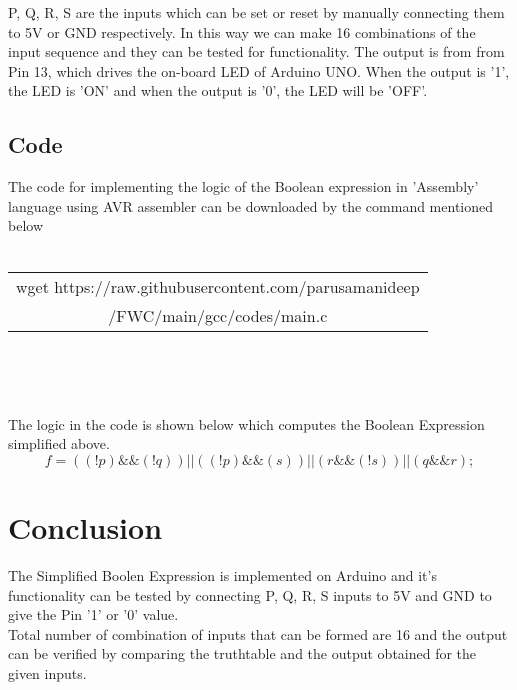 \documentclass[journal,12pt,twocolumn]{IEEEtran}
\begin{document}
P, Q, R, S are the inputs which can be set or reset by manually connecting them to 5V or GND respectively. In this way we can make 16 combinations of the input sequence and they can be tested for functionality.
The output is from from Pin 13, which drives the on-board LED of Arduino UNO. When the output is '1', the LED is 'ON' and when the output is '0', the LED will be 'OFF'.\\
 
\subsection{Code}
The code for implementing the logic of the Boolean expression in 'Assembly' language using AVR assembler can be downloaded by the command mentioned below \\ \\
\begin{table}[h]
\begin{tabular}{|c|}
    \hline
wget https://raw.githubusercontent.com/parusamanideep
\\/FWC/main/gcc/codes/main.c\\
     \hline
\end{tabular}\\
\end{table}\\
\bigskip

The logic in the code is shown below which computes the Boolean Expression simplified above.\\
$$ f = ((!p)\&\&(!q)) || ((!p)\&\&(s)) || (r\&\&(!s)) || (q\&\&r); $$


\section{Conclusion}
The Simplified Boolen Expression is implemented on Arduino and it's functionality can be tested by connecting P, Q, R, S inputs to 5V and GND to give the Pin '1' or '0' value.\\
Total number of combination of inputs that can be formed are 16 and the output can be verified by comparing the truthtable and the output obtained for the given inputs.
\end{document}

